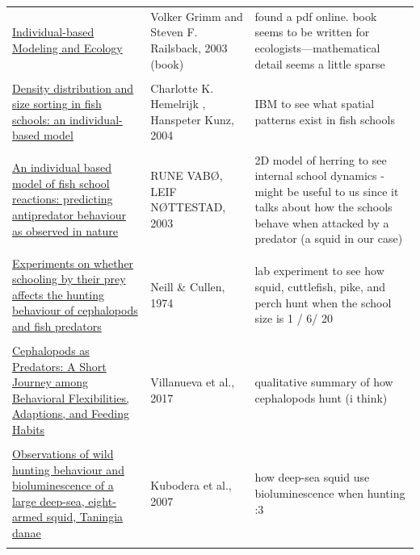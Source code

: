 \documentclass[12pt]{article}
\begin{document}
\begin{longtable}{p{2.0in}|p{1.0in}|p{2.5in}}
        \href{https://www.degruyterbrill.com/document/doi/10.1515/9781400850624/html}{Individual-based Modeling and Ecology} & Volker Grimm and Steven F. Railsback, 2003 (book) & found a pdf online. book seems to be written for ecologists---mathematical detail seems a little sparse\\ \\ 
        
        \href{https://academic.oup.com/beheco/article/16/1/178/206370}{Density distribution and size sorting in fish schools: an individual-based model} & Charlotte K. Hemelrijk , Hanspeter Kunz, 2004 & IBM to see what spatial patterns exist in fish schools \\ \\ 

        \href{https://onlinelibrary.wiley.com/doi/abs/10.1046/j.1365-2419.1997.00037.x}{
An individual based model of fish school reactions: predicting antipredator behaviour as observed in nature} &RUNE VABØ, LEIF NØTTESTAD, 2003 & 2D model of herring to see internal school dynamics - might be useful to us since it talks about how the schools behave when attacked by a predator (a squid in our case) \\ \\

        \href{https://zslpublications.onlinelibrary.wiley.com/doi/abs/10.1111/j.1469-7998.1974.tb04385.x}{Experiments on whether schooling by their prey affects the hunting behaviour of cephalopods and fish predators} & Neill \& Cullen, 1974 & lab experiment to see how squid, cuttlefish, pike, and perch hunt when the school size is 1 / 6/ 20 \\ \\

        \href{https://www.frontiersin.org/journals/physiology/articles/10.3389/fphys.2017.00598/full}{Cephalopods as Predators: A Short Journey among Behavioral Flexibilities, Adaptions, and Feeding Habits} & Villanueva et al., 2017 & qualitative summary of how cephalopods hunt (i think) \\ \\

        \href{https://pmc.ncbi.nlm.nih.gov/articles/PMC2124471/}{Observations of wild hunting behaviour and bioluminescence of a large deep-sea, eight-armed squid, Taningia danae} & Kubodera et al., 2007 & how deep-sea squid use bioluminescence when hunting :3 \\ \\


\end{longtable}
\end{document}
